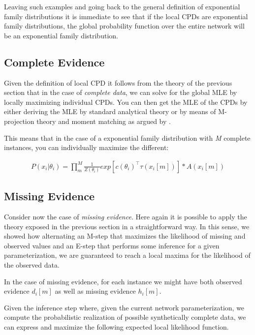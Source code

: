 \documentclass[11pt]{article}
\begin{document}
\begin{article}
Leaving such examples and going back to the general definition of
exponential family distributions it is immediate to see that if
the local CPDs are exponential family distributions, the global
probability function over the entire network will be an
exponential family distribution.

\subsection{Complete Evidence}
\label{sec:org3781c61}

Given the definition of local CPD it follows from the theory of the
previous section that in the case of \emph{complete data}, we can solve
for the global MLE by locally maximizing individual CPDs. You can
then get the MLE of the CPDs by either deriving the MLE by standard
analytical theory or by means of M-projection theory and moment
matching as argued by \cite{koller2009probabilistic}.

This means that in the case of a exponential family distribution
with \emph{M} complete instances, you can individually maximize the different:

\begin{align} \label{eq:exponential-family-likelihood}
P(x_i|\theta_i) = \prod_m^M \frac{1}{Z(\theta_i)} exp[c(\theta_i)^\intercal \tau(x_i[m])] * A(x_i[m]) 
\end{align}


\subsection{Missing Evidence}
\label{sec:org5cd63f5}

Consider now the case of \emph{missing evidence}. Here again it is
possible to apply the theory exposed in the previous section in a
straightforward way. In this sense, we showed how alternating an
M-step that maximizes the likelihood of missing and observed values
and an E-step that performs some inference for a given
parameterization, we are guaranteed to reach a local maxima for
the likelihood of the observed data.

In the case of missing evidence, for each instance we might have
both observed evidence \(d_i[m]\) as well as missing evidence \(h_i[m]\).

Given the inference step where, given the current network
parameterization, we compute the probabilistic realization of
possible synthetically complete data, we can express and maximize
the following expected local likelihood function.


\end{article}
\end{document}
